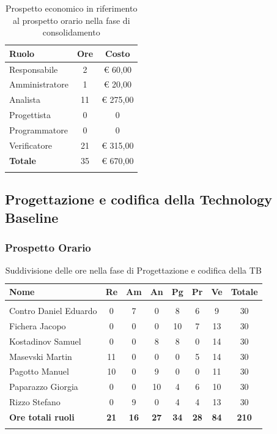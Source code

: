 \documentclass[../piano_di_progetto.tex]{subfiles}
\begin{document}
\begin{longtable}{|l|c|c|}
	\hline
	\rowcolor{lightgray}
	\textbf{Ruolo} & \textbf{Ore} & \textbf{Costo}\\
	\endhead
	\hline
	Responsabile & 2 & € 60,00 \\
	Amministratore & 1 & € 20,00 \\
	Analista & 11 & € 275,00 \\
	Progettista & 0 & 0 \\
	Programmatore & 0 & 0 \\
	Verificatore & 21 & € 315,00 \\
	\hline
	\textbf{Totale} & 35 & € 670,00 \\
	\hline
	\rowcolor{white}
	\caption{Prospetto economico in riferimento al prospetto orario nella fase di consolidamento} 
\end{longtable}

\subsection{Progettazione e codifica della Technology Baseline}%
\label{sub:fase_prog_arc}
\subsubsection{Prospetto Orario}

\begin{center}
	\begin{longtable}{|l|c|c|c|c|c|c|c|}
		\hline
		\rowcolor{lightgray}
		\textbf{Nome} & \textbf{Re} & \textbf{Am} & \textbf{An} & \textbf{Pg}  & \textbf{Pr}   & \textbf{Ve} & \textbf{Totale} \\
		\hline
		\endhead
		
		\hline
		\rowcolor{white}
		\multicolumn{8}{|c|}{\emph{Continua alla pagina successiva...}}\\
		\hline
		\endfoot

		\endlastfoot
		
		\hline
			Contro Daniel Eduardo 	& 0 & 7 & 0 & 8 & 6 & 9 & 30\\
			Fichera Jacopo 			& 0 & 0 & 0 & 10 & 7 & 13 & 30 \\
			Kostadinov Samuel		& 0 & 0 & 8 & 8 & 0 & 14 & 30 \\			
			Masevski Martin 		& 11 & 0 & 0 & 0 & 5 & 14 & 30 \\
			Pagotto Manuel 			& 10 & 0 & 9 & 0 & 0 & 11 & 30 \\			
			Paparazzo Giorgia 		& 0 & 0 & 10 & 4 & 6 & 10 & 30 \\
			Rizzo Stefano 			& 0 & 9 & 0 & 4 & 4 & 13 & 30\\
			\hline
		\textbf{Ore totali ruoli} & \textbf{21} & \textbf{16} & \textbf{27} & \textbf{34} & \textbf{28} & \textbf{84} & \textbf{210} \\
		\hline	
		\rowcolor{white}
		\caption{Suddivisione delle ore nella fase di Progettazione e codifica della TB}
	\end{longtable}
\end{center}
\end{document}
